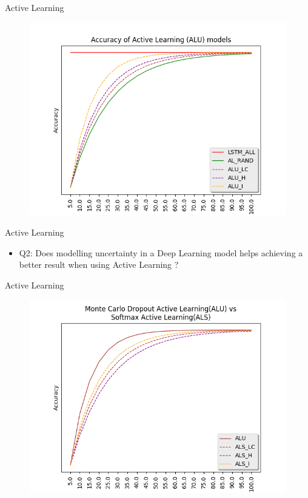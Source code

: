 \documentclass[10pt]{beamer}
\begin{document}
\begin{frame}[fragile]{Active Learning}
    \begin{figure}[htp]
        \centering
        \includegraphics[scale=0.6]{images/active_learning_comp_graph.png}
    \end{figure}
\end{frame}

\begin{frame}[fragile]{Active Learning}
    \begin{itemize}
        \item \alert{Q2}: Does modelling uncertainty in a Deep Learning model helps
            achieving a better result when using Active Learning ?
    \end{itemize}
\end{frame}

\begin{frame}[fragile]{Active Learning}
    \begin{figure}[htp]
        \centering
        \includegraphics[scale=0.6]{images/active_learning_selection_comp_graph.png}
    \end{figure}
\end{frame}
\end{document}
